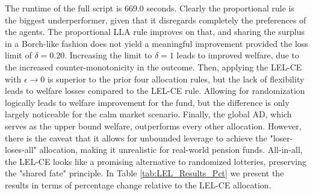 \documentclass[11pt,a4paper]{article}
\theoremstyle{definition}
\theoremstyle{plain}
\theoremstyle{remark}
\newcommand{\1}{\mathbf{1}}
\begin{document}
The runtime of the full script is 669.0 seconds. Clearly the proportional rule is the biggest underperformer, given that it disregards completely the preferences of the agents. The proportional LLA rule improves on that, and sharing the surplus in a Borch-like fashion does not yield a meaningful improvement provided the loss limit of $\delta = 0.20$. Increasing the limit to $\delta = 1$ leads to improved welfare, due to the increased counter-monotonicity in the outcome. Then, applying the LEL-CE with $\epsilon \to 0$ is superior to the prior four allocation rules, but the lack of flexibility leads to welfare losses compared to the LEL-CE rule. Allowing for randomization logically leads to welfare improvement for the fund, but the difference is only largely noticeable for the calm market scenario. Finally, the global AD, which serves as the upper bound welfare, outperforms every other allocation. However, there is the caveat that it allows for unbounded leverage to achieve the "loser-loses-all" allocation, making it unrealistic for real-world pension funds. All-in-all, the LEL-CE looks like a promising alternative to randomized lotteries, preserving the "shared fate" principle. In Table \ref{tab:LEL_Results_Pct} we present the results in terms of percentage change relative to the LEL-CE allocation.
\end{document}
